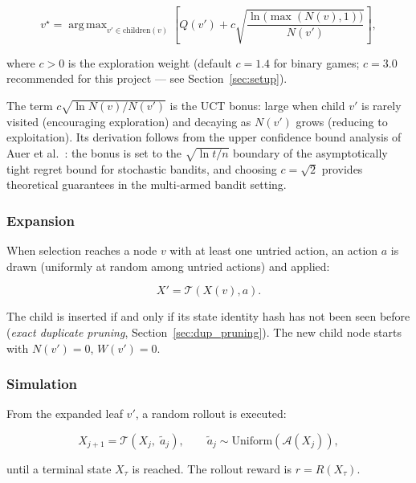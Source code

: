 \documentclass[11pt,a4paper]{article}
\theoremstyle{definition}
\theoremstyle{plain}
\newcommand{\calA}{\mathcal{A}}
\newcommand{\calT}{\mathcal{T}}
\DeclareMathOperator*{\argmax}{arg\,max}
\begin{document}
\begin{equation}
 v^\star
 = \argmax_{v' \in \mathrm{children}(v)}
  \left[
   Q(v')
   + c \sqrt{\frac{\ln\bigl(\max(N(v), 1)\bigr)}{N(v')}}
  \right],
 \label{eq:uct}
\end{equation}

where $c > 0$ is the exploration weight (default $c = 1.4$ for binary games; $c = 3.0$ recommended for this project — see Section~\ref{sec:setup}).

The term $c\sqrt{\ln N(v) / N(v')}$ is the UCT bonus: large when child $v'$ is rarely visited (encouraging exploration) and decaying as $N(v')$ grows (reducing to exploitation). Its derivation follows from the upper confidence bound analysis of Auer et al.\ \citep{auer2002finite}: the bonus is set to the $\sqrt{\ln t / n}$ boundary of the asymptotically tight regret bound for stochastic bandits, and choosing $c = \sqrt{2}$ provides theoretical guarantees in the multi-armed bandit setting.

\subsubsection{Expansion}
\label{sec:expansion}

When selection reaches a node $v$ with at least one untried action, an action $a$ is drawn (uniformly at random among untried actions) and applied:

\begin{equation}
 X' = \calT(X(v), a).
\end{equation}

The child is inserted if and only if its state identity hash has not been seen before (\emph{exact duplicate pruning}, Section~\ref{sec:dup_pruning}). The new child node starts with $N(v') = 0$, $W(v') = 0$.

\subsubsection{Simulation}
\label{sec:simulation}

From the expanded leaf $v'$, a random rollout is executed:

\begin{equation}
 X_{j+1} = \calT(X_j,\; \tilde{a}_j),
 \qquad
 \tilde{a}_j \sim \mathrm{Uniform}(\calA(X_j)),
\end{equation}

until a terminal state $X_\tau$ is reached. The rollout reward is $r = R(X_\tau)$.
\end{document}
